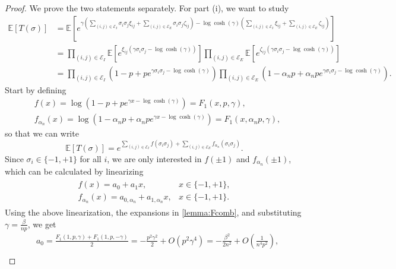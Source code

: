 \documentclass[11pt,oneside]{amsart}
\numberwithin{equation}{section}  %
\theoremstyle{plain}
\theoremstyle{remark}
\def \E {{\mathbb E}}
\def \cE {\mathcal{E}}
\begin{document}
\begin{proof}
We prove the two statements separately. For part (i), we want to study
\begin{equation*}
\begin{split}
\E\left[T(\sigma) \right] & = \E\left[e^{ \gamma \left( \sum_{(i,j) \in \cE_I} \sigma_i \sigma_j \xi_{ij} + \sum_{(i,j) \in \cE_E} \sigma_i \sigma_j \zeta_{ij} \right) - \log \cosh(\gamma) \left( \sum_{(i,j) \in \cE_I} \xi_{ij} + \sum_{(i,j) \in \cE_E} \zeta_{ij} \right) }\right] \\
& = \prod_{(i,j) \in \cE_I} \E \left[ e^{\xi_{ij} \left( \gamma \sigma_i \sigma_j - \log \cosh(\gamma) \right) } \right] \prod_{(i,j) \in \cE_E} \E \left[ e^{ \zeta_{ij} \left( \gamma \sigma_i \sigma_j - \log \cosh(\gamma) \right)  } \right] \\
& = \prod_{(i,j) \in \cE_I}\!\!\! \left( 1 - p + pe^{\gamma \sigma_i \sigma_j - \log \cosh(\gamma)}\right) \prod_{(i,j) \in \cE_E} \!\!\!\left( 1 - \alpha_n p + \alpha_n p e^{\gamma \sigma_i \sigma_j - \log \cosh (\gamma)}\right).
\end{split}
\end{equation*}
Start by defining
\begin{align*}
& f(x) = \log \left( 1-p+pe^{\gamma x - \log \cosh(\gamma)}\right) = F_1(x,p,\gamma), \\
& f_{\alpha_n}(x) = \log \left( 1-\alpha_n p+\alpha_n pe^{\gamma x - \log \cosh(\gamma)}\right) = F_1(x, \alpha_n p,\gamma),
\end{align*}
so that we can write
\begin{equation*}
\E[T(\sigma)] = e^{ \sum_{(i,j) \in \cE_I} f(\sigma_i \sigma_j) + \sum_{(i,j) \in \cE_E} f_{\alpha_n}(\sigma_i \sigma_j)}.
\end{equation*}
Since $\sigma_i \in \{ -1,+1 \}$ for all $i$, we are only interested in $f(\pm 1)$ and $f_{\alpha_n}(\pm 1)$, which can be calculated by linearizing 
\begin{align*} 
\begin{array}{ll}
f(x) = a_0 + a_1 x, & x \in \{ -1,+1 \}, \\
f_{\alpha_n}(x) = a_{0, \alpha_n} + a_{1, \alpha_n} x, & x \in \{ -1,+1 \}.
\end{array}
\end{align*}
Using the above linearization, the expansions in \ref{lemma:Fcomb}, and substituting $\gamma = \frac{\beta}{np}$, we get
\begin{align*}
& a_0 = \frac{F_1(1, p, \gamma) + F_1(1, p, -\gamma)}{2} = -\frac{p^2 \gamma^2}{2}  + O(p^2 \gamma^4) = -\frac{\beta^2}{2n^2} + O\left(\frac{1}{n^4p^2} \right), \\

\end{align*}
\end{proof}
\end{document}
